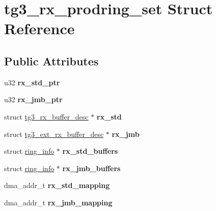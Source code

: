 \hypertarget{structtg3__rx__prodring__set}{
\section{tg3\_\-rx\_\-prodring\_\-set Struct Reference}
\label{structtg3__rx__prodring__set}
}
\subsection*{Public Attributes}
\begin{DoxyCompactItemize}
\item 
\hypertarget{structtg3__rx__prodring__set_a505b78aa5f4afd900f35f9019aa3ad21}{
u32 {\bfseries rx\_\-std\_\-ptr}}
\label{structtg3__rx__prodring__set_a505b78aa5f4afd900f35f9019aa3ad21}

\item 
\hypertarget{structtg3__rx__prodring__set_a873ff5e1bb79d41cdc39d11d21864fcb}{
u32 {\bfseries rx\_\-jmb\_\-ptr}}
\label{structtg3__rx__prodring__set_a873ff5e1bb79d41cdc39d11d21864fcb}

\item 
\hypertarget{structtg3__rx__prodring__set_af9fc038d3ad823a12360efe645881685}{
struct \hyperlink{structtg3__rx__buffer__desc}{tg3\_\-rx\_\-buffer\_\-desc} $\ast$ {\bfseries rx\_\-std}}
\label{structtg3__rx__prodring__set_af9fc038d3ad823a12360efe645881685}

\item 
\hypertarget{structtg3__rx__prodring__set_a32838083c4820beec710080a3f4ecf08}{
struct \hyperlink{structtg3__ext__rx__buffer__desc}{tg3\_\-ext\_\-rx\_\-buffer\_\-desc} $\ast$ {\bfseries rx\_\-jmb}}
\label{structtg3__rx__prodring__set_a32838083c4820beec710080a3f4ecf08}

\item 
\hypertarget{structtg3__rx__prodring__set_a47ee25bbadccff2d401ba883b226be69}{
struct \hyperlink{structring__info}{ring\_\-info} $\ast$ {\bfseries rx\_\-std\_\-buffers}}
\label{structtg3__rx__prodring__set_a47ee25bbadccff2d401ba883b226be69}

\item 
\hypertarget{structtg3__rx__prodring__set_ae00319ab13540235a191235c3afa990b}{
struct \hyperlink{structring__info}{ring\_\-info} $\ast$ {\bfseries rx\_\-jmb\_\-buffers}}
\label{structtg3__rx__prodring__set_ae00319ab13540235a191235c3afa990b}

\item 
\hypertarget{structtg3__rx__prodring__set_a7505c32fb5f0426ab5a9a28084534c8e}{
dma\_\-addr\_\-t {\bfseries rx\_\-std\_\-mapping}}
\label{structtg3__rx__prodring__set_a7505c32fb5f0426ab5a9a28084534c8e}

\item 
\hypertarget{structtg3__rx__prodring__set_acadf144d43eb123ac9aea3addf37b33a}{
dma\_\-addr\_\-t {\bfseries rx\_\-jmb\_\-mapping}}
\label{structtg3__rx__prodring__set_acadf144d43eb123ac9aea3addf37b33a}

\end{DoxyCompactItemize}


